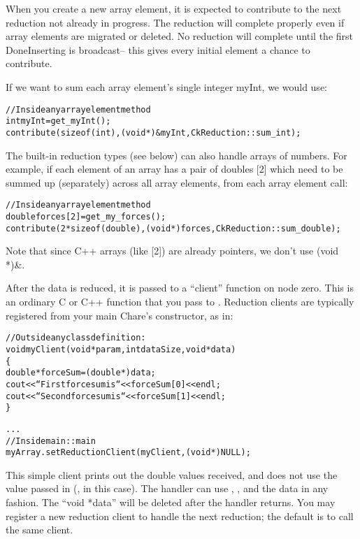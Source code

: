 When you create a new array element, it is expected
to contribute to the next reduction not already in progress.  The
reduction will complete properly even if array elements are migrated
or deleted. No reduction will complete until the first DoneInserting
is broadcast-- this gives every initial element a chance to contribute.

If we want to sum each array element's single integer myInt, we would use:

\begin{alltt}
    //Inside any array element method
    int myInt=get_myInt();
    contribute(sizeof(int),(void *)\&myInt,CkReduction::sum_int);
\end{alltt}

The built-in reduction types (see below) can also handle arrays of
numbers.  For example, if each element of an array has a pair of
doubles [2] which need to be summed up (separately) across
all array elements, from each array element call:

\begin{alltt}
    //Inside any array element method
    double forces[2]=get_my_forces();
    contribute(2*sizeof(double),(void *)forces,CkReduction::sum_double);
\end{alltt}

Note that since C++ arrays (like [2]) are already pointers, we 
don't use (void *)\&.


After the data is reduced, it is passed to a ``client'' function on
node zero.  This is an ordinary C or C++ function that you pass to
.  Reduction clients are
typically registered from your main Chare's constructor, as in:

\begin{alltt}
//Outside any class definition:
void myClient(void *param,int dataSize,void *data)
\{
  double *forceSum=(double *)data;
  cout<<``First force sum is ``<<forceSum[0]<<endl;
  cout<<``Second force sum is ``<<forceSum[1]<<endl;
\}

...
    //Inside main::main
    myArray.setReductionClient(myClient,(void *)NULL);
\end{alltt}

This simple client prints out the double values received, and does not
use the  value passed in (, in this case).  The
handler can use , , and the data in any
fashion.  The ``void *data'' will be deleted after the handler returns.
You may register a new reduction client to handle the next reduction;
the default is to call the same client.

